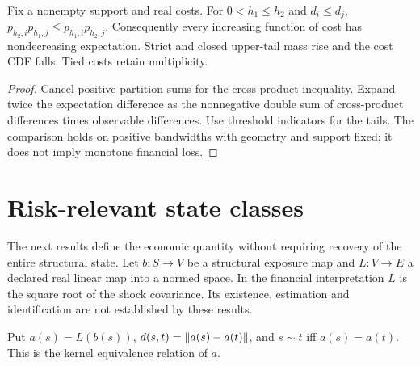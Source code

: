 \begin{theorem}\label{thm:bandwidth-stochastic-order}
  \leanok
  Fix a nonempty support and real costs. For $0<h_1\le h_2$ and $d_i\le d_j$,
  $p_{h_2,i}p_{h_1,j}\le p_{h_1,i}p_{h_2,j}$. Consequently every increasing
  function of cost has nondecreasing expectation. Strict and closed upper-tail
  mass rise and the cost CDF falls. Tied costs retain multiplicity.
\end{theorem}
\begin{proof}\leanok
  Cancel positive partition sums for the cross-product inequality. Expand
  twice the expectation difference as the nonnegative double sum of
  cross-product differences times observable differences. Use threshold
  indicators for the tails. The comparison holds on positive bandwidths with
  geometry and support fixed; it does not imply monotone financial loss.
\end{proof}

\section{Risk-relevant state classes}\label{sec:bp-risk-state}

The next results define the economic quantity without requiring recovery of the
entire structural state. Let $b:S\to V$ be a structural exposure map and
$L:V\to E$ a declared real linear map into a normed space. In the financial
interpretation $L$ is the square root of the shock covariance. Its existence,
estimation and identification are not established by these results.

\begin{definition}\label{def:risk-state}
  \leanok
  Put $a(s)=L(b(s))$, $d(s,t)=\left\lVert a(s)-a(t)\right\rVert$, and
  $s\sim t$ iff $a(s)=a(t)$. This is the kernel equivalence relation of $a$.
\end{definition}

